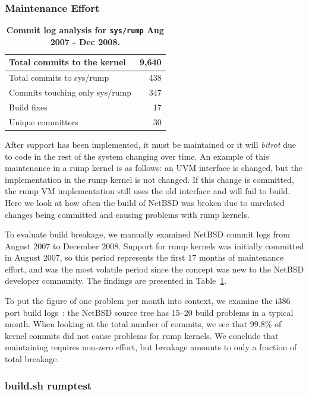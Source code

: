 \subsubsection{Maintenance Effort}
\label{chap:maint}

\begin{table}
\begin{tabular}{|l|r|}
\hline
Total commits to the kernel & 9,640 \\
\hline
Total commits to sys/rump & 438 \\
\hline
Commits touching only sys/rump & 347 \\
\hline
Build fixes & 17 \\
\hline
Unique committers & 30 \\
\hline
\end{tabular}
\caption[Commit log analysis for \texttt{sys/rump} Aug 2007 - Dec 2008]{
\textbf{Commit log analysis for \texttt{sys/rump} Aug 2007 - Dec 2008.}}
\label{tab:commits}
\end{table}

After support has been implemented, it must be maintained or it
will \textit{bitrot} due to code in the rest of the system changing over time.
An example of this maintenance in a rump kernel is as follows: an
UVM interface is changed, but the implementation in the rump kernel
is not changed.  If this change is committed,
the rump VM implementation still uses the old interface and will
fail to build.  Here we look at how often the build of NetBSD
was broken due to unrelated changes being committed and causing
problems with rump kernels.

To evaluate build breakage, we manually examined NetBSD commit logs
from August 2007 to December 2008.  Support for rump kernels was
initially committed in August 2007, so this period represents the
first 17 months of maintenance effort, and was the most volatile
period since the concept was new to the NetBSD developer community.
The findings are presented in Table~\ref{tab:commits}.

To put the figure of one problem per month into context, we examine
the i386 port build logs~\cite{gson:build}: the NetBSD source
tree has 15--20 build problems in a typical month.  When looking
at the total number of commits, we see that 99.8\% of kernel commits
did not cause problems for rump kernels.  We conclude that maintaining
requires non-zero effort, but breakage amounts to only a fraction
of total breakage.

\subsubsection*{build.sh rumptest}
\label{sect:rumptest}

